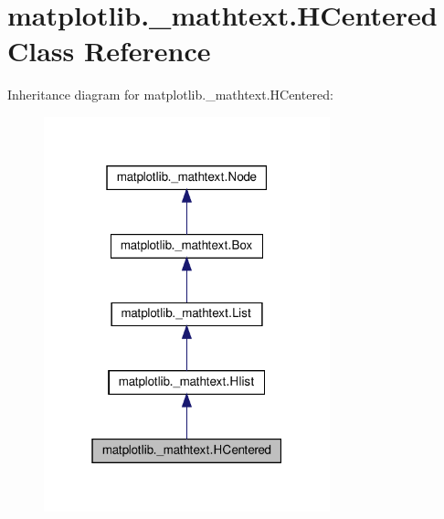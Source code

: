 \hypertarget{classmatplotlib_1_1__mathtext_1_1HCentered}{}\section{matplotlib.\+\_\+mathtext.\+H\+Centered Class Reference}
\label{classmatplotlib_1_1__mathtext_1_1HCentered}


Inheritance diagram for matplotlib.\+\_\+mathtext.\+H\+Centered\+:
\nopagebreak
\begin{figure}[H]
\begin{center}
\leavevmode
\includegraphics[width=235pt]{classmatplotlib_1_1__mathtext_1_1HCentered__inherit__graph}
\end{center}
\end{figure}


